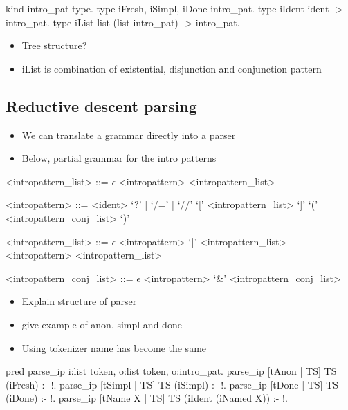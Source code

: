 \documentclass[thesis.tex]{subfiles}
\begin{document}
{{\begin{elpicode}
  kind intro_pat type.
  type iFresh, iSimpl, iDone intro_pat.
  type iIdent ident -> intro_pat.
  type iList list (list intro_pat) -> intro_pat.
\end{elpicode}
  \begin{itemize}
    \item Tree structure?
    \item iList is combination of existential, disjunction and conjunction pattern
  \end{itemize}


\subsection{Reductive descent parsing}
  \begin{itemize}
    \item We can translate a grammar directly into a parser
    \item Below, partial grammar for the intro patterns
  \end{itemize}

  \begin{grammar}
    <intropattern\_list> ::= $\epsilon$
    \alt <intropattern> <intropattern\_list>

    <intropattern> ::= <ident>
    \alt `?' | `/=' | `//'
    \alt `[' <intropattern\_list> `]'
    \alt `(' <intropattern\_conj\_list> `)'

    <intropattern\_list> ::= $\epsilon$
    \alt <intropattern> `|' <intropattern\_list>
    \alt <intropattern> <intropattern\_list>

    <intropattern\_conj\_list> ::= $\epsilon$
    \alt <intropattern> `&' <intropattern\_conj\_list>
  \end{grammar}

  \begin{itemize}
    \item Explain structure of parser
    \item give example of anon, simpl and done
    \item Using tokenizer name has become the same
  \end{itemize}

  \begin{elpicode}
  pred parse_ip i:list token, o:list token, o:intro_pat.
  parse_ip [tAnon | TS] TS (iFresh) :- !.
  parse_ip [tSimpl | TS] TS (iSimpl) :- !.
  parse_ip [tDone | TS] TS (iDone) :- !.
  parse_ip [tName X | TS] TS (iIdent (iNamed X)) :- !.
\end{elpicode}

}}
\end{document}

